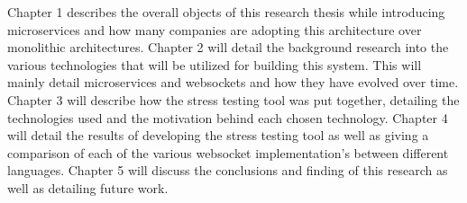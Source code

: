 Chapter 1 describes the overall objects of this research thesis while introducing microservices and how many companies are adopting this architecture over monolithic architectures. Chapter 2 will detail the background research into the various technologies that will be utilized for building this system. This will mainly detail microservices and websockets and how they have evolved over time. Chapter 3 will describe how the stress testing tool was put together, detailing the technologies used and the motivation behind each chosen technology. Chapter 4 will detail the results of developing the stress testing tool as well as giving a comparison of each of the various websocket implementation's between different languages. Chapter 5 will discuss the conclusions and finding of this research as well as detailing future work.